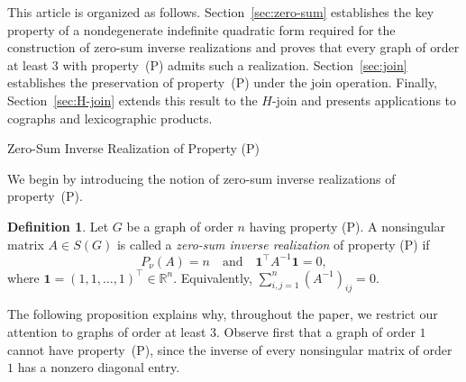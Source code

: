 \documentclass[12pt,reqno]{amsart}
\makeatletter
\theoremstyle{definition}
\newtheorem{defn}[thm]{Definition}
\numberwithin{equation}{subsection}
\numberwithin{equation}{section}
\def\section{\def\@secnumfont{\mdseries}\@startsection{section}{1}%
  \z@{.7\linespacing\@plus\linespacing}{.5\linespacing}%
  {\normalfont\scshape\centering}}
\makeatother
\begin{document}

This article is organized as follows. Section~\ref{sec:zero-sum} establishes the key property of a nondegenerate indefinite quadratic form required for the construction of zero-sum inverse realizations and proves that every graph of order at least \(3\) with property~(P) admits such a realization. Section~\ref{sec:join} establishes the preservation of property~(P) under the join operation. Finally, Section~\ref{sec:H-join} extends this result to the \(H\)-join and presents applications to cographs and lexicographic products.


\section{Zero-Sum Inverse Realization of Property (P)}\label{sec:zero-sum}

We begin by introducing the notion of zero-sum inverse realizations of property~(P).

\begin{defn}\label{def:zero_sum_realization}
Let $G$ be a graph of order $n$ having property (P). A nonsingular matrix
$A\in S(G)$ is called a \emph{zero-sum inverse realization} of property (P) if
\[
P_\nu(A)=n
\quad\text{and}\quad
\mathbf{1}^{\top}A^{-1}\mathbf{1}=0,
\]
where $\mathbf{1}=(1,1,\ldots,1)^{\top} \in \mathbb{R}^n$. Equivalently,
\(
\sum_{i,j=1}^{n}(A^{-1})_{ij}=0.
\)
\end{defn}
The following proposition explains why, throughout the paper, we restrict our attention to graphs of order at least \(3\). Observe first that a graph of order \(1\) cannot have property~(P), since the inverse of every nonsingular matrix of order \(1\) has a nonzero diagonal entry.
\end{document}
